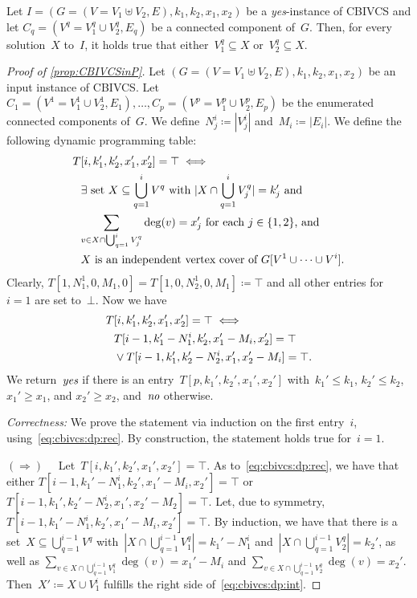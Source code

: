 \documentclass[10pt,a4paper,twocolumn]{article}
\theoremstyle{plain}
\theoremstyle{definition}
\theoremstyle{remark}
\newcommand{\prob}[1]{\textnormal{\textsc{#1}}}
\newcommand{\RD}{$(\Rightarrow)\quad$}
\newcommand{\yes}{\emph{yes}}
\newcommand{\no}{\emph{no}}
\newcommand{\ceq}{\coloneqq}
\newcommand{\false}{\bot}
\newcommand{\true}{\top}
\begin{document}
{{  \begin{observation}
  \label{obs:ivcinccs}
  Let $I=(G=(V=V_1\uplus V_2,E),k_1,k_2,x_1,x_2)$ be a \yes-instance of \prob{CBIVCS} 
  and let $C_q=(V^q=V_1^q\cup V_2^q,E_q)$ be a connected component of~$G$.
  Then,
  for every solution~$X$ to~$I$,
  it holds true that either~$V_1^q\subseteq X$ or~$V_2^q\subseteq X$.
  \end{observation}


  \begin{proof}[Proof of \cref{prop:CBIVCSinP}]
  Let $(G=(V=V_1\uplus V_2,E),k_1,k_2,x_1,x_2)$ be an input instance of \prob{CBIVCS}.
  Let~$C_1=(V^1=V_1^1\cup V_2^1,E_1),\dots,C_p=(V^p=V_1^p\cup V_2^p,E_p)$ be the enumerated connected components of~$G$.
  We define~$N_j^i\ceq |V_j^i|$ and~$M_i\ceq |E_i|$.
  We define the following dynamic programming table:
  \begin{align}
    T&[i,k_1',k_2',x_1',x_2'] =\true \iff 
    \notag\\
    &\exists\text{ set~$X\subseteq \bigcup_{q=1}^i V^q$ with~$|X\cap \bigcup_{q=1}^i V^q_j|=k_j'$ and} \notag\\
      & \text{$\sum_{v\in X\cap \bigcup_{q=1}^i V^q_j} \deg(v)= x_j'$ for each~$j\in\{1,2\}$, and} \notag\\
      & \text{$X$ is an independent vertex cover of~$G[V^1\cup\dots\cup V^i]$.} \label{eq:cbivcs:dp:int}
  \end{align}
  Clearly, 
  $T[1,N_1^1,0,M_1,0]=T[1,0,N_2^1,0,M_1]\ceq \true$ and all other entries for~$i=1$ are set to~$\false$.
  Now we have
  \begin{align}
    T&[i,k_1',k_2',x_1',x_2']=\true \iff \notag\\
    & T[i-1,k_1'-N_1^i,k_2',x_1'-M_i,x_2']=\true \notag
    \\ &\lor T[i-1,k_1',k_2'-N_2^i,x_1',x_2'-M_i]=\true \label{eq:cbivcs:dp:rec}.
  \end{align}
  We return~$\yes$ if there is an entry~$T[p,k_1',k_2',x_1',x_2']$ with~$k_1'\leq k_1$, $k_2'\leq k_2$, $x_1'\geq x_1$, and $x_2'\geq x_2$,
  and~$\no$ otherwise.
  
  \smallskip\noindent\textit{Correctness:}
  We prove the statement via induction on the first entry~$i$, 
  using~\eqref{eq:cbivcs:dp:rec}.
  By construction,
  the statement holds true for~$i=1$.
  
  \RD{}
  Let~$T[i,k_1',k_2',x_1',x_2'] =\true$.
  As to~\eqref{eq:cbivcs:dp:rec},
  we have that either $T[i-1,k_1'-N_1^i,k_2',x_1'-M_i,x_2']=\true$ or $T[i-1,k_1',k_2'-N_2^i,x_1',x_2'-M_2]=\true$.
  Let,
  due to symmetry,
  $T[i-1,k_1'-N_1^i,k_2',x_1'-M_i,x_2']=\true$.
  By induction,
  we have that there is a set~$X\subseteq \bigcup_{q=1}^{i-1} V^q$ with~$|X\cap \bigcup_{q=1}^{i-1} V^q_1|=k_1'-N_1^i$
  and~$|X\cap \bigcup_{q=1}^{i-1} V^q_2|=k_2'$,
  as well as
  $\sum_{v\in X\cap \bigcup_{q=1}^{i-1} V^q_1} \deg(v)= x_1'-M_i$
  and $\sum_{v\in X\cap \bigcup_{q=1}^{i-1} V^q_2} \deg(v)= x_2'$.
  Then~$X'\ceq X\cup V_1^i$ fulfills the right side of~\eqref{eq:cbivcs:dp:int}.
  

\end{proof}}}
\end{document}
